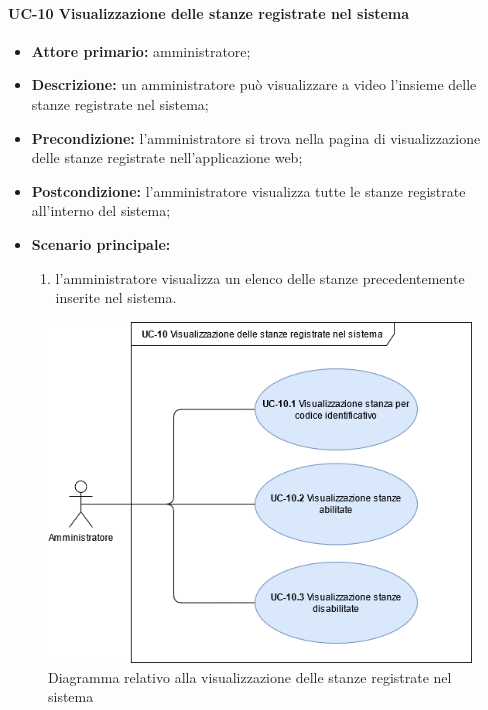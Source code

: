 
\paragraph{UC-10 Visualizzazione delle stanze registrate nel sistema}
\begin{itemize}
    \item \textbf{Attore primario:} amministratore;
    \item \textbf{Descrizione:} un amministratore pu\`{o} visualizzare a video l'insieme delle stanze registrate nel sistema;
    \item \textbf{Precondizione:} l'amministratore si trova nella pagina di visualizzazione delle stanze registrate nell'applicazione web;
    \item \textbf{Postcondizione:} l'amministratore visualizza tutte le stanze registrate all'interno del sistema;
    \item \textbf{Scenario principale:}
    \begin{enumerate}
        \item l'amministratore visualizza un elenco delle stanze precedentemente inserite nel sistema.
    \end{enumerate}
\end{itemize}

\begin{figure}[H]
    \centering
      \includegraphics[scale=0.50]{src/CasiDUso/immagini/VisualizzazioneStanzeRegistrate.png}
    \caption{Diagramma relativo alla visualizzazione delle stanze registrate nel sistema}
\end{figure}


